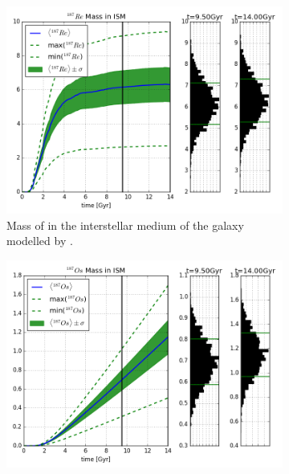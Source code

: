 \begin{figure}
  \centering
  \begin{subfigure}{\subfigwidth}
    \includegraphics[width=\linewidth]{results/MCExperiment_revised_2_delmax/combined_plot_Re-187_decayed.png}
    \caption{ \label{fig:MCExperiment-delmax-re187} \footnotesize
      Mass of  in the interstellar medium of the galaxy modelled by \omegamodel.
    }
  \end{subfigure}
  \hfill
  \begin{subfigure}{\subfigwidth}
    \includegraphics[width=\linewidth]{results/MCExperiment_revised_2_delmax/combined_plot_Os-187_decayed.png}
    \caption{ \label{fig:MCExperiment-delmax-os187} \footnotesize
}
\end{subfigure}
\end{figure}
